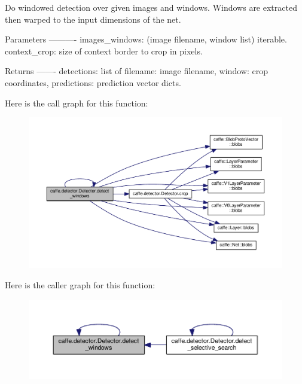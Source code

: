 \begin{DoxyVerb}Do windowed detection over given images and windows. Windows are
extracted then warped to the input dimensions of the net.

Parameters
----------
images_windows: (image filename, window list) iterable.
context_crop: size of context border to crop in pixels.

Returns
-------
detections: list of {filename: image filename, window: crop coordinates,
    predictions: prediction vector} dicts.
\end{DoxyVerb}
 Here is the call graph for this function\+:
\nopagebreak
\begin{figure}[H]
\begin{center}
\leavevmode
\includegraphics[width=350pt]{classcaffe_1_1detector_1_1_detector_a7ddd403050bacd8fcccc62705f2405ff_cgraph}
\end{center}
\end{figure}
Here is the caller graph for this function\+:
\nopagebreak
\begin{figure}[H]
\begin{center}
\leavevmode
\includegraphics[width=350pt]{classcaffe_1_1detector_1_1_detector_a7ddd403050bacd8fcccc62705f2405ff_icgraph}
\end{center}
\end{figure}
\mbox{\label{classcaffe_1_1detector_1_1_detector_a7ddd403050bacd8fcccc62705f2405ff}} 
